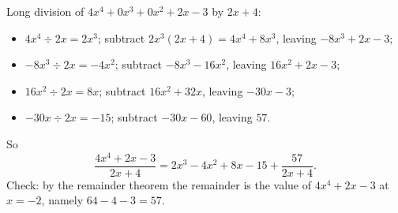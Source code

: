 Long division of $4x^4+0x^3+0x^2+2x-3$ by $2x+4$:
\begin{itemize}
\item $4x^4\div2x=2x^3$; subtract $2x^3(2x+4)=4x^4+8x^3$, leaving $-8x^3+2x-3$;
\item $-8x^3\div2x=-4x^2$; subtract $-8x^3-16x^2$, leaving $16x^2+2x-3$;
\item $16x^2\div2x=8x$; subtract $16x^2+32x$, leaving $-30x-3$;
\item $-30x\div2x=-15$; subtract $-30x-60$, leaving $57$.
\end{itemize}
So
\[\dfrac{4x^4+2x-3}{2x+4}=\boxed{2x^3-4x^2+8x-15+\dfrac{57}{2x+4}}.\]
Check: by the remainder theorem the remainder is the value of $4x^4+2x-3$ at $x=-2$, namely $64-4-3=57$.
